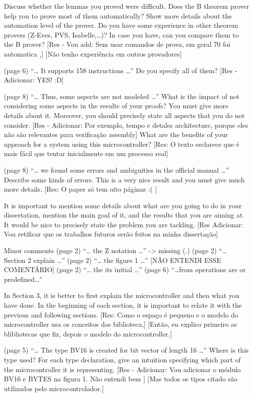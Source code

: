 Discuss whether the lemmas you proved were difficult. Does the B theorem prover
help you to prove most of them automatically? Show more details about the
automation level of the prover. Do you have some experience in other theorem
provers (Z-Eves, PVS, Isabelle,…)? In case you have, can you compare them to the
B prover?
[Res - Vou add: Sem usar comandos de prova, em geral 70 foi automatica  ,]
[Não tenho experiência em outros provadores]




(page 6) “… It supports 158 instructions …” Do you specify all of them?
[Res - Adicionar: YES! :D]

(page 8) “… Thus, some aspects are not modeled …” What is the impact of not
considering some aspects in the results of your proofs? You must give more
details about it. Moreover, you should precisely state all aspects that you do
not consider.
[Res - Adicionar: Por exemplo, tempo e detales architecture, porque eles não são relevantes para
verificação assembly]
What are the benefits of your approach for a system using this microcontroller?
[Res: O texto esclarece que é mais fácil que tentar inicialmente em um processo real]



(page 8) “… we found some errors and ambiguities in the official manual …”
Describe some kinds of errors. This is a very nice result and you must give much
more details.
[Res: O paper só tem oito páginas :( ]

It is important to mention some details about what are you going to do in your
dissertation, mention the main goal of it, and the results that you are aiming
at. It would be nice to precisely state the problem you are tackling.
[Res Adicionar: Vou retificar que os trabalhos futuros serão feitos na minha dissertação]



Minor comments (page 2) 
“… the Z notation …” -> missing (.) 
(page 2) 
“… Section 2 explain …” 
(page 2) “… the figure 1 …”  [NÃO ENTENDI ESSE COMENTÁRIO] 
(page 2) “… the its initial …” 
(page 6) “…from operations are or predefined…”

In Section 3, it is better to first explain the microcontroller and then what you
have done. In the beginning of each section, it is important to relate it with
the previous and following sections.
[Res: Como o espaço é pequeno e o modelo do microcontroller usa os conceitos das biblioteca,]
[Então, eu explico primeiro as blibliotecas que fiz, depois o modelo do microcontroller.]

(page 5) “… The type BV16 is created for bit vector of length 16 …” Where is this
type used? For each type declaration, give an intuition specifying which part of
the microcontroller it is representing.
[Res - Adicionar: Vou adicionar o módulo BV16 e BYTES na figura 1. Não entendi bem ]
[Mas todos os tipos citado são utilizados pelo microcontrolador.]